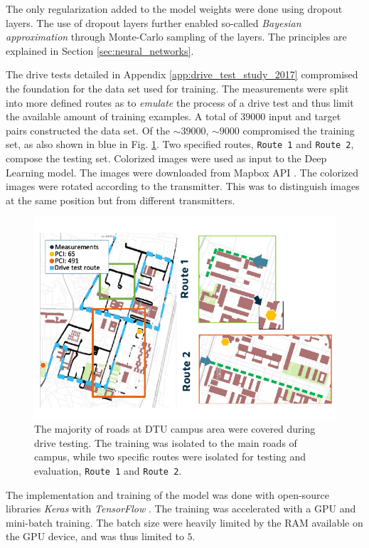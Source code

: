 The only regularization added to the model weights were done using dropout layers. The use of dropout layers further enabled so-called \emph{Bayesian approximation} through Monte-Carlo sampling of the layers. The principles are explained in Section \ref{sec:neural_networks}. 

The drive tests detailed in Appendix \ref{app:drive_test_study_2017} compromised the foundation for the data set used for training. The measurements were split into more defined routes as to \emph{emulate} the process of a drive test and thus limit the available amount of training examples. A total of $39000$ input and target pairs constructed the data set. Of the $\sim 39000$, $\sim 9000$ compromised the training set, as also shown in blue in Fig. \ref{fig:drive_test_routes_split}. Two specified routes, \texttt{Route 1} and \texttt{Route 2}, compose the testing set. Colorized images were used as input to the Deep Learning model. The images were downloaded from Mapbox API \cite{MapboxWebsite}. The colorized images were rotated according to the transmitter. This was to distinguish images at the same position but from different transmitters.

\begin{figure}
    \centering
    \includegraphics{chapters/part_pathloss/drive_test_minimzation_paper/route_drawing.pdf}
    \caption{The majority of roads at DTU campus area were covered during drive testing. The training was isolated to the main roads of campus, while two specific routes were isolated for testing and evaluation, \texttt{Route 1} and \texttt{Route 2}.}
    \label{fig:drive_test_routes_split}
\end{figure}

The implementation and training of the model was done with open-source libraries \emph{Keras} \cite{chollet2015keras} with \emph{TensorFlow} \cite{tensorflow2015-whitepaper}. The training was accelerated with a GPU and mini-batch training. The batch size were heavily limited by the RAM available on the GPU device, and was thus limited to $5$. 


